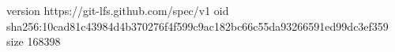 version https://git-lfs.github.com/spec/v1
oid sha256:10cad81c43984d4b370276f4f599c9ac182bc66c55da93266591ed99dc3ef359
size 168398
